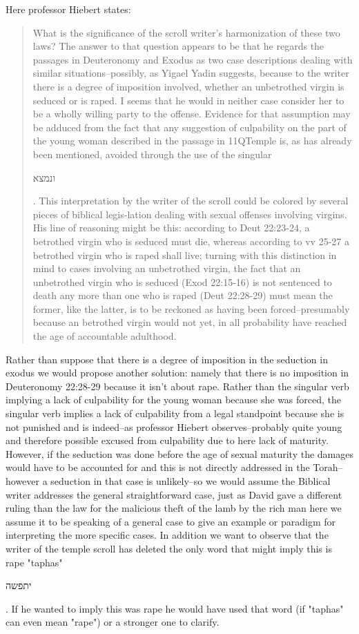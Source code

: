 \documentclass[11pt]{article}
\begin{document}
Here professor Hiebert states:
\begin{quote}
What is the significance of the scroll writer's harmonization of these two laws? The answer to that question appears to be that he regards the passages in Deuteronomy and Exodus as two case descriptions dealing with similar situations--possibly, as Yigael Yadin suggests, because to the writer there is a degree of imposition involved, whether an unbetrothed virgin is seduced or is raped. I seems that he would in neither case consider her to be a wholly willing party to the offense. Evidence for that assumption may be adduced from the fact that any suggestion of culpability on the part of the young woman described in the passage in 11QTemple is, as has already been mentioned, avoided through the use of the singular\begin{hebrew}ונמצא\end{hebrew}. This interpretation by the writer of the scroll could be colored by several pieces of biblical legis-lation dealing with sexual offenses involving virgins. His line of reasoning might be this: according to Deut 22:23-24, a betrothed virgin who is seduced must die, whereas according to vv 25-27 a betrothed virgin who is raped shall live; turning with this distinction in mind to cases involving an unbetrothed virgin, the fact that an unbetrothed virgin who is seduced (Exod 22:15-16) is not sentenced to death any more than one who is raped (Deut 22:28-29) must mean the former, like the latter, is to be reckoned as having been forced--presumably because an betrothed virgin would not yet, in all probability have reached the age of accountable adulthood.
\end{quote}


Rather than suppose that there is a degree of imposition in the seduction in exodus we would propose another solution: namely that there is no imposition in Deuteronomy 22:28-29 because it isn't about rape. 
Rather than the singular verb implying a lack of culpability for the young woman because she was forced, the singular verb implies a lack of culpability from a legal standpoint because she is not punished and is indeed--as professor Hiebert observes--probably quite young and therefore possible excused from culpability due to here lack of maturity. However, if the seduction was done before the age of sexual maturity the damages would have to be accounted for and this is not directly addressed in the Torah--however a seduction in that case is unlikely--so we would assume the Biblical writer addresses the general straightforward case, just as David gave a different ruling than the law for the malicious theft of the lamb by the rich man here we assume it to be speaking of a general case to give an example or paradigm for interpreting the more specific cases. 
In addition we want to observe that the writer of the temple scroll has deleted the only word that might imply this is rape "taphas" \begin{hebrew}יתפשה\end{hebrew}. If he wanted to imply this was rape he would have used that word (if "taphas" can even mean "rape") or a stronger one to clarify. 
\end{document}

